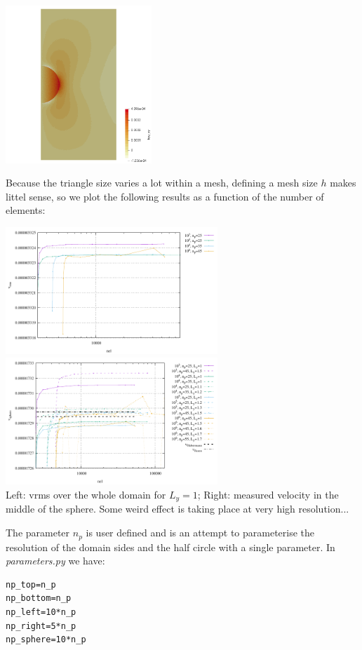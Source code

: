 \begin{center}
\includegraphics[width=5.5cm]{python_codes/fieldstone_92/results/tauxy}
\end{center}

Because the triangle size varies a lot within a mesh, defining a mesh size $h$
makes littel sense, so we plot the following results as a function of the 
number of elements:

\begin{center}
\includegraphics[width=8cm]{python_codes/fieldstone_92/results/vrms}
\includegraphics[width=8cm]{python_codes/fieldstone_92/results/vc}\\
{\captionfont Left: vrms over the whole domain for $L_y=1$; Right: 
measured velocity in the middle of the sphere. Some weird 
effect is taking place at very high resolution...}
\end{center}

The parameter $n_p$ is user defined and is an attempt to parameterise 
the resolution of the domain sides and the half circle with a single parameter.
In {\sl parameters.py} we have:
\begin{lstlisting}
np_top=n_p
np_bottom=n_p
np_left=10*n_p
np_right=5*n_p
np_sphere=10*n_p
\end{lstlisting}

